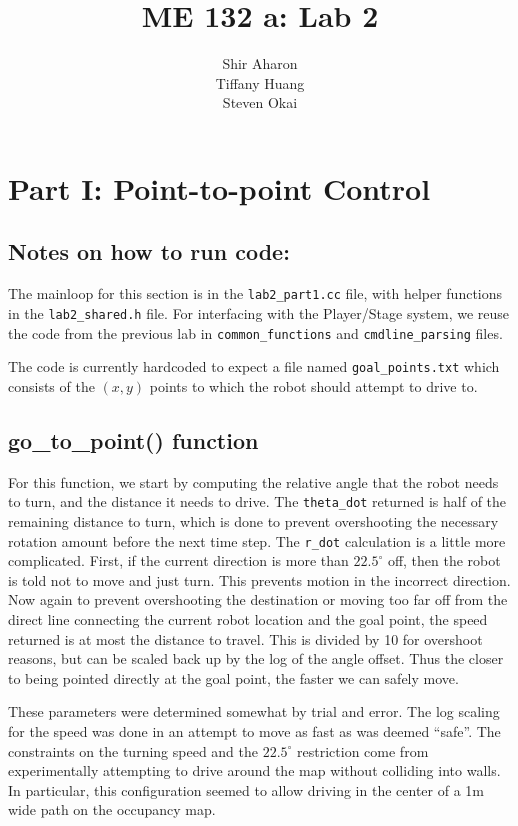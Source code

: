 \documentclass[10pt, titlepage, onecolumn, fleqn]{article}
\title{ME 132 a: Lab 2}
\author{Shir Aharon\\Tiffany Huang\\Steven Okai}
\begin{document}
\maketitle

\section{Part I: Point-to-point Control}

\subsection*{Notes on how to run code:}

The mainloop for this section is in the \verb|lab2_part1.cc| file, with helper functions in the \verb|lab2_shared.h| file. For interfacing with the Player/Stage system, we reuse the code from the previous lab in \verb|common_functions| and \verb|cmdline_parsing| files.

The code is currently hardcoded to expect a file named \verb|goal_points.txt| which consists of the $(x,y)$ points to which the robot should attempt to drive to.

\subsection{go\_to\_point() function}

For this function, we start by computing the relative angle that the robot needs to turn, and the distance it needs to drive. The \verb|theta_dot| returned is half of the remaining distance to turn, which is done to prevent overshooting the necessary rotation amount before the next time step. The \verb|r_dot| calculation is a little more complicated. First, if the current direction is more than $22.5^\circ$ off, then the robot is told not to move and just turn. This prevents motion in the incorrect direction. Now again to prevent overshooting the destination or moving too far off from the direct line connecting the current robot location and the goal point, the speed returned is at most the distance to travel. This is divided by 10 for overshoot reasons, but can be scaled back up by the log of the angle offset. Thus the closer to being pointed directly at the goal point, the faster we can safely move.

These parameters were determined somewhat by trial and error. The log scaling for the speed was done in an attempt to move as fast as was deemed ``safe''. The constraints on the turning speed and the $22.5^\circ$ restriction come from experimentally attempting to drive around the map without colliding into walls. In particular, this configuration seemed to allow driving in the center of a 1m wide path on the occupancy map.
\end{document}
